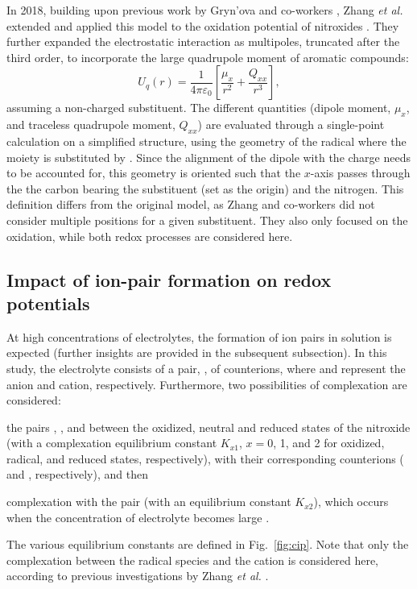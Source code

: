 \documentclass[review,preprint]{elsarticle}
\begin{document}
In 2018, building upon previous work by Gryn'ova and co-workers \cite{grynovaOriginScopeLongRange2013,grynovaSwitchingRadicalStability2013}, Zhang \textit{et al.} extended and applied this model to the oxidation potential of nitroxides \cite{zhangEffectHeteroatomFunctionality2018}. They further expanded the electrostatic interaction as multipoles, truncated after the third order, to incorporate the large quadrupole moment of aromatic compounds:
\begin{equation}
	U_q(r) =\frac{1}{4\pi\varepsilon_0} \left[\frac{\mu_x}{r^2} + \frac{Q_{xx}}{r^3}\right], \label{eq:Er}
\end{equation}
assuming a non-charged substituent. The different quantities (dipole moment, $\mu_x$, and traceless quadrupole moment, $Q_{xx}$) are evaluated through a single-point calculation on a simplified structure, using the geometry of the radical where the  moiety is substituted by . Since the alignment of the dipole with the charge needs to be accounted for, this geometry is oriented such that the $x$-axis passes through the the carbon bearing the substituent (set as the origin) and the nitrogen. This definition differs from the original model, as Zhang and co-workers \cite{zhangEffectHeteroatomFunctionality2018} did not consider multiple positions for a given substituent. They also only focused on the oxidation, while both redox processes are considered here.


\subsection{Impact of ion-pair formation on redox potentials}

At high concentrations of electrolytes, the formation of ion pairs in solution is expected (further insights are provided in the subsequent subsection). In this study, the electrolyte consists of a pair, , of counterions, where  and  represent the anion and cation, respectively. Furthermore, two possibilities of complexation are considered: \begin{inparaenum}[(i)]
	\item the pairs , , and  between the oxidized, neutral and reduced states of the nitroxide  (with a complexation equilibrium constant $K_{x1}$, $x=0$, 1, and 2 for oxidized, radical, and reduced states, respectively), with their corresponding counterions ( and , respectively), and then
	\item complexation with the  pair (with an equilibrium constant $K_{x2}$), which occurs when the concentration of electrolyte becomes large \cite{wylieImprovedPerformanceAllOrganic2019a}.
\end{inparaenum}
The various equilibrium constants are defined in Fig.~\ref{fig:cip}. Note that only the complexation between the radical species and the cation is considered here, according to previous investigations by Zhang \textit{et al.} \cite{zhangInteractionsImidazoliumBasedIonic2016,zhangEffectHeteroatomFunctionality2018}.
\end{document}
